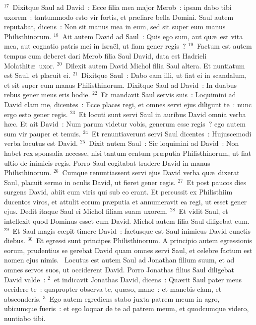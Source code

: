${}^{17}$~Dixitque Saul ad David~: Ecce filia mea major Merob~: ipsam dabo tibi uxorem~: tantummodo esto vir fortis, et pr\ae liare bella Domini. Saul autem reputabat, dicens~: Non sit manus mea in eum, sed sit super eum manus Philisthinorum.
${}^{18}$~Ait autem David ad Saul~: Quis ego sum, aut qu\ae\ est vita mea, aut cognatio patris mei in Isra\"el, ut fiam gener regis~?
${}^{19}$~Factum est autem tempus cum deberet dari Merob filia Saul David, data est Hadrieli Molathit\ae\ uxor.
${}^{20}$~Dilexit autem David Michol filia Saul altera. Et nuntiatum est Saul, et placuit ei.
${}^{21}$~Dixitque Saul~: Dabo eam illi, ut fiat ei in scandalum, et sit super eum manus Philisthinorum. Dixitque Saul ad David~: In duabus rebus gener meus eris hodie.
${}^{22}$~Et mandavit Saul servis suis~: Loquimini ad David clam me, dicentes~: Ecce places regi, et omnes servi ejus diligunt te~: nunc ergo esto gener regis.
${}^{23}$~Et locuti sunt servi Saul in auribus David omnia verba h\ae c. Et ait David~: Num parum videtur vobis, generum esse regis~? ego autem sum vir pauper et tenuis.
${}^{24}$~Et renuntiaverunt servi Saul dicentes~: Hujuscemodi verba locutus est David.
${}^{25}$~Dixit autem Saul~: Sic loquimini ad David~: Non habet rex sponsalia necesse, nisi tantum centum pr\ae putia Philisthinorum, ut fiat ultio de inimicis regis. Porro Saul cogitabat tradere David in manus Philisthinorum.
${}^{26}$~Cumque renuntiassent servi ejus David verba qu\ae\ dixerat Saul, placuit sermo in oculis David, ut fieret gener regis.
${}^{27}$~Et post paucos dies surgens David, abiit cum viris qui sub eo erant. Et percussit ex Philisthiim ducentos viros, et attulit eorum pr\ae putia et annumeravit ea regi, ut esset gener ejus. Dedit itaque Saul ei Michol filiam suam uxorem.
${}^{28}$~Et vidit Saul, et intellexit quod Dominus esset cum David. Michol autem filia Saul diligebat eum.
${}^{29}$~Et Saul magis cœpit timere David~: factusque est Saul inimicus David cunctis diebus.
${}^{30}$~Et egressi sunt principes Philisthinorum. A principio autem egressionis eorum, prudentius se gerebat David quam omnes servi Saul, et celebre factum est nomen ejus nimis.
~\lettrine[lines=10,image=true,loversize=0.05,lraise=-0.03]{L}{}ocutus est autem Saul ad Jonathan filium suum, et ad omnes servos suos, ut occiderent David. Porro Jonathas filius Saul diligebat David valde~:
${}^{2}$~et indicavit Jonathas David, dicens~: Qu\ae rit Saul pater meus occidere te~: quapropter observa te, qu\ae so, mane~: et manebis clam, et absconderis.
${}^{3}$~Ego autem egrediens stabo juxta patrem meum in agro, ubicumque fueris~: et ego loquar de te ad patrem meum, et quodcumque videro, nuntiabo tibi.
